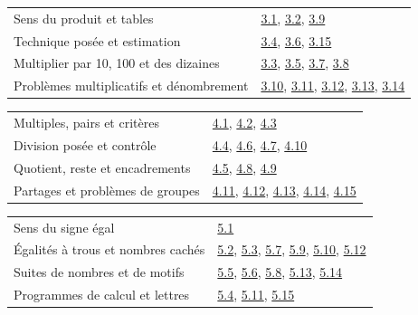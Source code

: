 \begin{tabularx}{\linewidth}{@{}Yl@{}}\toprule
Sens du produit et tables & \hyperref[exo-3-1]{3.1}, \hyperref[exo-3-2]{3.2}, \hyperref[exo-3-9]{3.9}\\[2mm]
Technique posée et estimation & \hyperref[exo-3-4]{3.4}, \hyperref[exo-3-6]{3.6}, \hyperref[exo-3-15]{3.15}\\[2mm]
Multiplier par 10, 100 et des dizaines & \hyperref[exo-3-3]{3.3}, \hyperref[exo-3-5]{3.5}, \hyperref[exo-3-7]{3.7}, \hyperref[exo-3-8]{3.8}\\[2mm]
Problèmes multiplicatifs et dénombrement & \hyperref[exo-3-10]{3.10}, \hyperref[exo-3-11]{3.11}, \hyperref[exo-3-12]{3.12}, \hyperref[exo-3-13]{3.13}, \hyperref[exo-3-14]{3.14}\\[2mm]
\bottomrule\end{tabularx}\par\vspace{4mm}
\clearpage
{}\fontsize{10}{13}\selectfont
{}\begin{tabularx}{\linewidth}{@{}Yl@{}}\toprule
Multiples, pairs et critères & \hyperref[exo-4-1]{4.1}, \hyperref[exo-4-2]{4.2}, \hyperref[exo-4-3]{4.3}\\[2mm]
Division posée et contrôle & \hyperref[exo-4-4]{4.4}, \hyperref[exo-4-6]{4.6}, \hyperref[exo-4-7]{4.7}, \hyperref[exo-4-10]{4.10}\\[2mm]
Quotient, reste et encadrements & \hyperref[exo-4-5]{4.5}, \hyperref[exo-4-8]{4.8}, \hyperref[exo-4-9]{4.9}\\[2mm]
Partages et problèmes de groupes & \hyperref[exo-4-11]{4.11}, \hyperref[exo-4-12]{4.12}, \hyperref[exo-4-13]{4.13}, \hyperref[exo-4-14]{4.14}, \hyperref[exo-4-15]{4.15}\\[2mm]
\bottomrule\end{tabularx}\par\vspace{4mm}
\begin{tabularx}{\linewidth}{@{}Yl@{}}\toprule
Sens du signe égal & \hyperref[exo-5-1]{5.1}\\[2mm]
Égalités à trous et nombres cachés & \hyperref[exo-5-2]{5.2}, \hyperref[exo-5-3]{5.3}, \hyperref[exo-5-7]{5.7}, \hyperref[exo-5-9]{5.9}, \hyperref[exo-5-10]{5.10}, \hyperref[exo-5-12]{5.12}\\[2mm]
Suites de nombres et de motifs & \hyperref[exo-5-5]{5.5}, \hyperref[exo-5-6]{5.6}, \hyperref[exo-5-8]{5.8}, \hyperref[exo-5-13]{5.13}, \hyperref[exo-5-14]{5.14}\\[2mm]
Programmes de calcul et lettres & \hyperref[exo-5-4]{5.4}, \hyperref[exo-5-11]{5.11}, \hyperref[exo-5-15]{5.15}\\[2mm]
\bottomrule\end{tabularx}\par\vspace{4mm}
